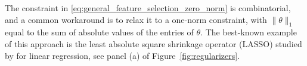 The constraint in \eqref{eq:general_feature_selection_zero_norm} is 
combinatorial, and a common workaround is to relax it to a one-norm constraint, 
with $\|\theta\|_1$ equal to the sum of absolute values of the entries of $\theta$. 
The best-known example of this approach is the least absolute square shrinkage operator (LASSO) studied by \cite{Tibshirani1996} for linear regression, 
see panel (a) of Figure~\ref{fig:regularizers}.
 
  
